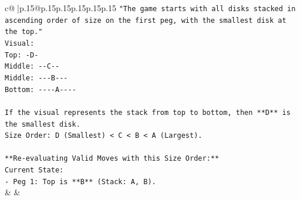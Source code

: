 \documentclass{article}
\begin{document}
{\begin{supertabular}{c@{$\;$}|p{.15\linewidth}@{}p{.15\linewidth}p{.15\linewidth}p{.15\linewidth}p{.15\linewidth}p{.15\linewidth}}
{{{\texttt{"The game starts with all disks stacked in ascending order of size on the first peg, with the smallest disk at the top."} \\
\texttt{Visual:} \\
\texttt{Top: {-}D{-}} \\
\texttt{Middle: {-}{-}C{-}{-}} \\
\texttt{Middle: {-}{-}{-}B{-}{-}{-}} \\
\texttt{Bottom: {-}{-}{-}{-}A{-}{-}{-}{-}} \\
\\ 
\texttt{If the visual represents the stack from top to bottom, then **D** is the smallest disk.} \\
\texttt{Size Order: D (Smallest) < C < B < A (Largest).} \\
\\ 
\texttt{**Re{-}evaluating Valid Moves with this Size Order:**} \\
\texttt{Current State:} \\
\texttt{{-} Peg 1: Top is **B** (Stack: A, B).} \\
            }
        }
    }
    & & \\ \\


\end{supertabular}}
\end{document}

